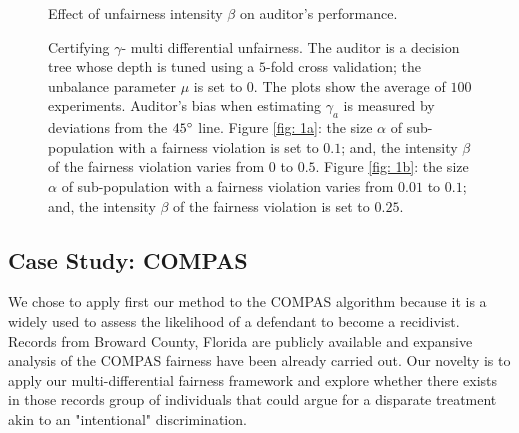 \documentclass{article}
\begin{document}
\begin{figure}[h!]
\centering
{}
\caption{Effect of unfairness intensity $\beta$ on auditor's performance.}
\label{fig: 2a}
\caption{Certifying $\gamma$- multi differential unfairness. The auditor is a decision tree whose depth is tuned using a $5$-fold cross validation; the unbalance parameter $\mu$ is set to $0$.  The plots show the average of $100$ experiments. Auditor's bias when estimating $\gamma_{a}$ is measured by deviations from the $45\degree$ line. Figure \ref{fig: 1a}: the size $\alpha$ of sub-population with a fairness violation is set to $0.1$; and, the intensity $\beta$ of the fairness violation varies from $0$ to $0.5$. Figure \ref{fig: 1b}: the size $\alpha$ of sub-population with a fairness violation varies from $0.01$ to $0.1$; and, the intensity $\beta$ of the fairness violation is set to $0.25$. } 
\end{figure}


\subsection{Case Study: COMPAS}
We chose to apply first our method to the COMPAS algorithm because it is a widely used to assess the likelihood of a defendant to become a recidivist. Records from Broward County, Florida are publicly available and expansive analysis of the COMPAS fairness have been already carried out. Our novelty is to apply our multi-differential fairness framework and explore whether there exists in those records group of individuals that could argue for a disparate treatment akin to an "intentional" discrimination. 
\end{document}
